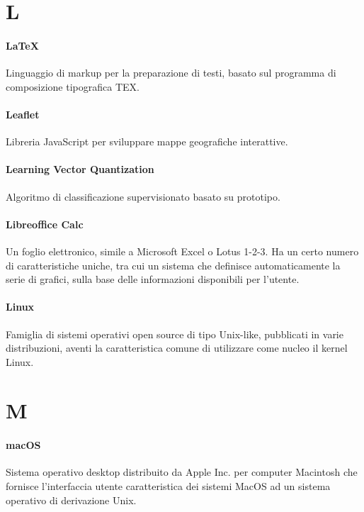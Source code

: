 \documentclass[]{article}
\begin{document}
	\newpage

	\section*{L}

	\paragraph*{LaTeX}
	Linguaggio di markup per la preparazione di testi, basato sul programma di composizione tipografica TEX.

	\paragraph*{Leaflet}
	Libreria JavaScript per sviluppare mappe geografiche interattive.

	\paragraph*{Learning Vector Quantization}
	Algoritmo di classificazione supervisionato basato su prototipo.

	\paragraph*{Libreoffice Calc}
	Un foglio elettronico, simile a Microsoft Excel o Lotus 1-2-3. Ha un certo numero di caratteristiche uniche, tra cui un sistema che definisce automaticamente la serie di grafici, sulla base delle informazioni disponibili per l'utente.

	\paragraph*{Linux}
	Famiglia di sistemi operativi open source di tipo Unix-like, pubblicati in varie distribuzioni, aventi la caratteristica comune di utilizzare come nucleo il kernel Linux.

	\newpage

	\section*{M}

	\paragraph*{macOS}
	Sistema operativo desktop distribuito da Apple Inc. per	computer Macintosh che fornisce l'interfaccia utente caratteristica dei sistemi	MacOS ad un sistema operativo di derivazione Unix.
\end{document}

